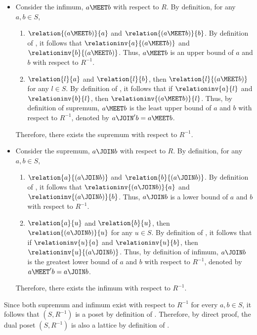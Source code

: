 \begin{enumerate}
\begin{subprove}
    \begin{itemize}
      \item Consider the infimum, $a \MEET b$ with respect to $R$.
      By definition, for any $a, b \in S$,
      \begin{enumerate}
        \item $\relation{(a \MEET b)}{a}$ and $\relation{(a \MEET b)}{b}$.
        By definition of , 
        it follows that $\relationinv{a}{(a \MEET b)}$ and $\relationinv{b}{(a \MEET b)}$.
        Thus, $a \MEET b$ is an upper bound of $a$ and $b$ with respect to $R^{-1}$.
        \item $\relation{l}{a}$ and $\relation{l}{b}$, 
        then $\relation{l}{(a \MEET b)}$ for any $l \in S$.
        By definition of , it follows that 
        if $\relationinv{a}{l}$ and $\relationinv{b}{l}$, then $\relationinv{(a \MEET b)}{l}$.
        Thus, by definition of supremum, $a \MEET b$ is the least upper bound of $a$ and $b$ 
        with respect to $R^{-1}$, denoted by $a \JOIN' b = a \MEET b$.
      \end{enumerate}
      Therefore, there exists the supremum with respect to $R^{-1}$.
      \item Consider the supremum, $a \JOIN b$ with respect to $R$.
      By definition, for any $a, b \in S$,
      \begin{enumerate}
        \item $\relation{a}{(a \JOIN b)}$ and $\relation{b}{(a \JOIN b)}$.
        By definition of , 
        it follows that $\relationinv{(a \JOIN b)}{a}$ and $\relationinv{(a \JOIN b)}{b}$.
        Thus, $a \JOIN b$ is a lower bound of $a$ and $b$ with respect to $R^{-1}$.
        \item $\relation{a}{u}$ and $\relation{b}{u}$, 
        then $\relation{(a \JOIN b)}{u}$ for any $u \in S$.
        By definition of , it follows that 
        if $\relationinv{u}{a}$ and $\relationinv{u}{b}$, then $\relationinv{u}{(a \JOIN b)}$.
        Thus, by definition of infimum, $a \JOIN b$ is the greatest lower bound of $a$ and $b$ 
        with respect to $R^{-1}$, denoted by $a \MEET' b = a \JOIN b$.
      \end{enumerate}
      Therefore, there exists the infimum with respect to $R^{-1}$.
    \end{itemize}
    Since both supremum and infimum exist with respect to $R^{-1}$ for every $a, b \in S$,
    it follows that $(S, R^{-1})$ is a poset by definition of .
    Therefore, by direct proof, the dual poset $\left(S, R^{-1}\right)$ is also a lattice by definition of .
  \end{subprove}


\end{enumerate}
